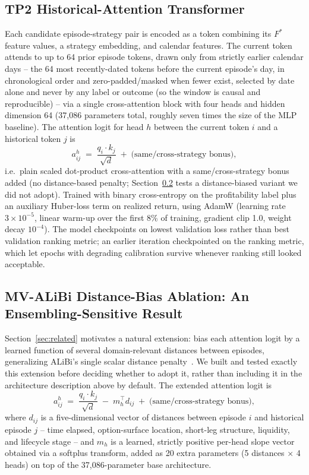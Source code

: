 \documentclass[sigconf,review]{acmart}
\begin{document}
\subsection{TP2 Historical-Attention Transformer}
\label{sec:transformer}
Each candidate episode-strategy pair is encoded as a token combining its $F^{\ast}$ feature values, a strategy embedding, and calendar features. The current token attends to up to 64 prior episode tokens, drawn only from strictly earlier calendar days -- the 64 most recently-dated tokens before the current episode's day, in chronological order and zero-padded/masked when fewer exist, selected by date alone and never by any label or outcome (so the window is causal and reproducible) -- via a single cross-attention block with four heads and hidden dimension 64 (37{,}086 parameters total, roughly seven times the size of the MLP baseline). The attention logit for head $h$ between the current token $i$ and a historical token $j$ is
\[
a_{ij}^{h} \;=\; \frac{q_i \cdot k_j}{\sqrt{d}} \;+\; \text{(same/cross-strategy bonus)},
\]
i.e.\ plain scaled dot-product cross-attention with a same/cross-strategy bonus added (no distance-based penalty; Section~\ref{sec:mvalibi-ablation} tests a distance-biased variant we did not adopt). Trained with binary cross-entropy on the profitability label plus an auxiliary Huber-loss term on realized return, using AdamW (learning rate $3\times10^{-5}$, linear warm-up over the first 8\% of training, gradient clip 1.0, weight decay $10^{-4}$). The model checkpoints on lowest validation loss rather than best validation ranking metric; an earlier iteration checkpointed on the ranking metric, which let epochs with degrading calibration survive whenever ranking still looked acceptable.

\subsection{MV-ALiBi Distance-Bias Ablation: An Ensembling-Sensitive Result}
\label{sec:mvalibi-ablation}
Section~\ref{sec:related} motivates a natural extension: bias each attention logit by a learned function of several domain-relevant distances between episodes, generalizing ALiBi's single scalar distance penalty~\cite{press2022alibi}. We built and tested exactly this extension before deciding whether to adopt it, rather than including it in the architecture description above by default. The extended attention logit is
\[
a_{ij}^{h} \;=\; \frac{q_i \cdot k_j}{\sqrt{d}} \;-\; m_h^{\top} d_{ij} \;+\; \text{(same/cross-strategy bonus)},
\]
where $d_{ij}$ is a five-dimensional vector of distances between episode $i$ and historical episode $j$ -- time elapsed, option-surface location, short-leg structure, liquidity, and lifecycle stage -- and $m_h$ is a learned, strictly positive per-head slope vector obtained via a softplus transform, added as 20 extra parameters (5 distances $\times$ 4 heads) on top of the 37{,}086-parameter base architecture.
\end{document}

